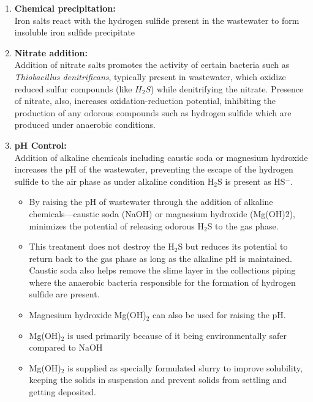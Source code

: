 \begin{enumerate}

			
\item \textbf{Chemical precipitation:}\\
Iron salts react with the hydrogen sulfide present in the wastewater to form insoluble iron sulfide precipitate


\item \textbf{Nitrate addition:}\\
Addition of nitrate salts promotes the activity of certain bacteria such as \textit{Thiobacillus denitrificans}, typically present in wastewater, which oxidize reduced sulfur compounds (like $H_2S$) while denitrifying the nitrate.  Presence of nitrate, also, increases oxidation-reduction potential, inhibiting the production of any odorous compounds such as hydrogen sulfide which are produced under anaerobic conditions.

\item \textbf{pH Control:}\\

Addition of alkaline chemicals including caustic soda or magnesium hydroxide increases the pH of the wastewater, preventing the escape of the hydrogen sulfide to the air phase as under alkaline condition H$_2$S is present as HS$^-$.  


\begin{itemize}
\item By raising the pH of wastewater through the addition of alkaline chemicals—caustic soda (NaOH)  or magnesium hydroxide (Mg(OH)2), minimizes the potential of releasing odorous H$_2$S to the gas phase.
\item This treatment does not destroy the H$_2$S but reduces its potential to return back to the gas phase as long as the alkaline pH is maintained.
Caustic soda also helps remove the slime layer in the collections piping where the anaerobic bacteria responsible for the formation of hydrogen sulfide are present.  

\item Magnesium hydroxide Mg(OH)$_2$ can also be used for raising the pH.
\item Mg(OH)$_2$ is used primarily because of it being environmentally safer compared to NaOH
\item Mg(OH)$_2$ is supplied as specially formulated slurry to improve solubility, keeping the solids in suspension and prevent solids from settling and getting deposited.
\end{itemize}



\end{enumerate}
